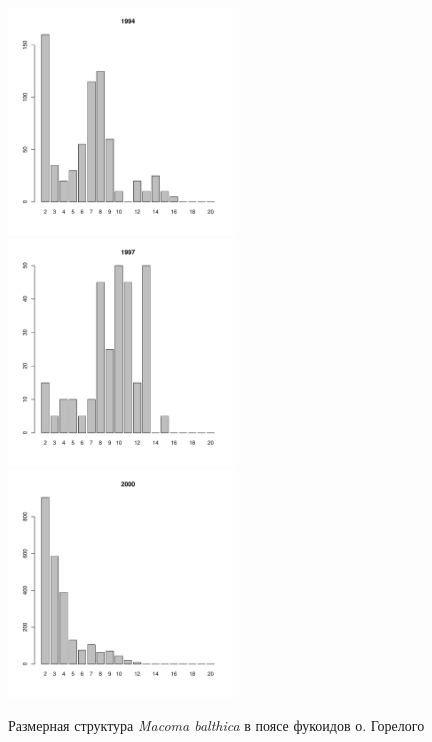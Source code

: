 \documentclass[12pt, a4paper]{article}
\begin{document}
\begin{figure}[h]
\begin{multicols}{3}
\hfill
\includegraphics[width=60mm]{../White_Sea/Luvenga_Goreliy/midlow2_1994_.pdf}
\hfill
\includegraphics[width=60mm]{../White_Sea/Luvenga_Goreliy/midlow2_1997_.pdf}
\hfill
\includegraphics[width=60mm]{../White_Sea/Luvenga_Goreliy/midlow2_2000_.pdf}
\end{multicols}



\caption{Размерная структура {\it Macoma balthica} в поясе фукоидов о. Горелого}
\label{ris:size_str_Goreliy_midlow}
\end{figure}
\end{document}

